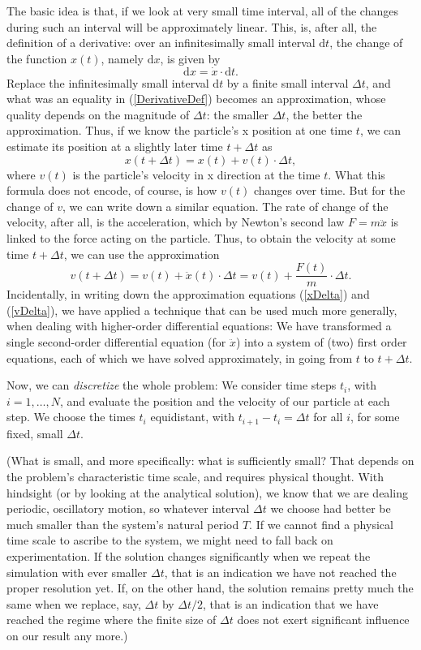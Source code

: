 \documentclass[twocolumn,apj]{openjournal}
\newcommand{\be}{\begin{equation}}
\newcommand{\ee}{\end{equation}}
\newcommand{\Dd}{\mathrm{d}}
\begin{document}
The basic idea is that, if we look at very small time interval, all of the changes during such an interval will be approximately linear. This, is, after all, the definition of a derivative: over an infinitesimally small interval $\Dd t$, the change of the function $x(t)$, namely $\Dd x$, is given by
\be
\Dd x = \dot{x}\cdot \Dd t.
\label{DerivativeDef}
\ee
Replace the infinitesimally small interval $\Dd t$ by a finite small interval $\Delta t$, and what was an equality in (\ref{DerivativeDef}) becomes an approximation, whose quality depends on the magnitude of $\Delta t$: the smaller $\Delta t$, the better the approximation. Thus, if we know the particle's x position at one time $t$, we can estimate its position at a slightly later time $t+\Delta t$ as
\be
x(t+\Delta t) = x(t) + v(t)\cdot \Delta t,
\label{xDelta}
\ee
where $v(t)$ is the particle's velocity in x direction at the time $t$. What this formula does not encode, of course, is how $v(t)$ changes over time. But for the change of $v$, we can write down a similar equation. The rate of change of the velocity, after all, is the acceleration, which by Newton's second law $F=m\ddot{x}$ is linked to the force acting on the particle. Thus, to obtain the velocity at some time $t+\Delta t$, we can use the approximation
\be
v(t+\Delta t) = v(t) + \ddot{x}(t)\cdot\Delta t = v(t) + \frac{F(t)}{m}\cdot\Delta t.
\label{vDelta}
\ee
Incidentally, in writing down the approximation equations (\ref{xDelta}) and (\ref{vDelta}), we have applied a technique that can be used much more generally, when dealing with higher-order differential equations: We have transformed a single second-order differential equation (for $\ddot{x}$) into a system of (two) first order equations, each of which we have solved approximately, in going from $t$ to $t+\Delta t$. 

Now, we can {\em discretize} the whole problem: We consider time steps $t_i$, with $i=1,\ldots,N$, and evaluate the position and the velocity of our particle at each step. We choose the times $t_i$ equidistant, with $t_{i+1}-t_i=\Delta t$ for all $i$, for some fixed, small $\Delta t$. 

(What is small, and more specifically: what is sufficiently small? That depends on the problem's characteristic time scale, and requires physical thought. With hindsight (or by looking at the analytical solution), we know that we are dealing periodic, oscillatory motion, so whatever interval $\Delta t$ we choose had better be much smaller than the system's natural period $T$. If we cannot find a physical time scale to ascribe to the system, we might need to fall back on experimentation. If the solution changes significantly when we repeat the simulation with ever smaller $\Delta t$, that is an indication we have not reached the proper resolution yet. If, on the other hand, the solution remains pretty much the same when we replace, say, $\Delta t$ by $\Delta t/2$, that is an indication that we have reached the regime where the finite size of $\Delta t$ does not exert significant influence on our result any more.)
\end{document}
